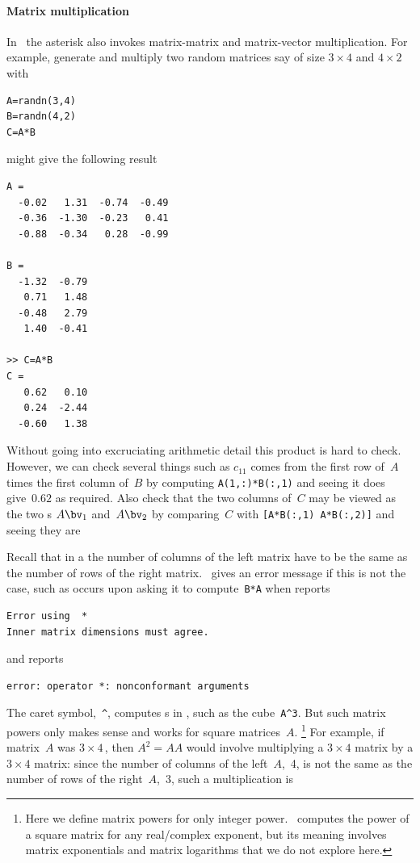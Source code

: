 \paragraph{Matrix multiplication}
In \script\ the asterisk also invokes matrix-matrix and matrix-vector multiplication.
For example, generate and multiply two random matrices say of size \(3\times4\) and \(4\times 2\) with 
\begin{verbatim}
A=randn(3,4)
B=randn(4,2)
C=A*B
\end{verbatim}
\setbox\ajrqrbox\hbox{}%
\marginajrbox%
might give the following result \twodp\ 
\begin{verbatim}
A =
  -0.02   1.31  -0.74  -0.49
  -0.36  -1.30  -0.23   0.41
  -0.88  -0.34   0.28  -0.99

B =
  -1.32  -0.79
   0.71   1.48
  -0.48   2.79
   1.40  -0.41

>> C=A*B
C =
   0.62   0.10
   0.24  -2.44
  -0.60   1.38
\end{verbatim}
Without going into excruciating arithmetic detail this product is hard to check.
However, we can check several things such as \(c_{11}\) comes from the first row of~\(A\) times the first column of~\(B\) by computing \verb|A(1,:)*B(:,1)| and seeing it does give~\(0.62\) as required.
Also check that the two columns of~\(C\) may be viewed as the two \idx{matrix-vector product}s \(A\bv_1\) and~\(A\bv_2\) by comparing~\(C\) with \verb|[A*B(:,1) A*B(:,2)]| and seeing they are 

Recall that in a  the number of columns of the left matrix have to be the same as the number of rows of the right matrix.
\script\ gives an error message if this is not the case, such as occurs  upon asking it to compute~\verb|B*A| when \script[1] reports
\index{Error using@\texttt{Error using}}%
%
%
\begin{verbatim}
Error using  * 
Inner matrix dimensions must agree.
\end{verbatim}
and \script[2] reports
\begin{verbatim}
error: operator *: nonconformant arguments
\end{verbatim}

The caret symbol,~\verb|^|, computes s in \script, such as the cube~\verb|A^3|. 
But such matrix powers only makes sense and works for square matrices~\(A\).%
\footnote{Here we define matrix powers for only integer power. \script\ computes the power of a square matrix for any real\slash complex exponent, but its meaning involves matrix exponentials and matrix logarithms that we do not explore here.}
For example, if matrix~\(A\) was \(3\times4\)\,, then \(A^2=AA\) would involve multiplying a \(3\times4\) matrix by a \(3\times4\) matrix: since the number of columns of the left~\(A\),~4, is not the same as the number of rows of the right~\(A\),~3, such a multiplication is 



